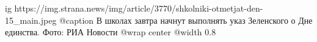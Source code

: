  
 
 
 
 

\ifcmt
  ig https://img.strana.news/img/article/3770/shkolniki-otmetjat-den-15_main.jpeg
  @caption В школах завтра начнут выполнять указ Зеленского о Дне единства. Фото: РИА Новости 
  @wrap center
  @width 0.8
\fi
